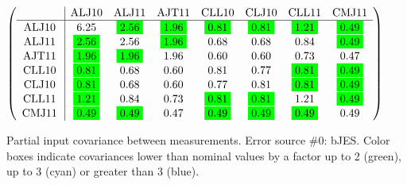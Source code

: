 \begin{table}[H]
\scriptsize
\begin{center}
\renewcommand{\arraystretch}{1.1}
\begin{math}\left(\begin{array}{c|ccccccc}
 & \mathrm{ALJ10} & 
\mathrm{ALJ11} & 
\mathrm{AJT11} & 
\mathrm{CLL10} & 
\mathrm{CLJ10} & 
\mathrm{CLL11} & 
\mathrm{CMJ11} \\
\hline
\mathrm{ALJ10} \hspace*{2pt} &       6.25 &  \colorbox{Green1}{$      2.56$} &  \colorbox{Green1}{$      1.96$} &  \colorbox{Green1}{$      0.81$} &  \colorbox{Green1}{$      0.81$} &  \colorbox{Green1}{$      1.21$} &  \colorbox{Green1}{$      0.49$} \\
\mathrm{ALJ11} \hspace*{2pt} &  \colorbox{Green1}{$      2.56$} &       2.56 &  \colorbox{Green1}{$      1.96$} &       0.68 &       0.68 &       0.84 &  \colorbox{Green1}{$      0.49$} \\
\mathrm{AJT11} \hspace*{2pt} &  \colorbox{Green1}{$      1.96$} &  \colorbox{Green1}{$      1.96$} &       1.96 &       0.60 &       0.60 &       0.73 &       0.47 \\
\mathrm{CLL10} \hspace*{2pt} &  \colorbox{Green1}{$      0.81$} &       0.68 &       0.60 &       0.81 &       0.77 &  \colorbox{Green1}{$      0.81$} &  \colorbox{Green1}{$      0.49$} \\
\mathrm{CLJ10} \hspace*{2pt} &  \colorbox{Green1}{$      0.81$} &       0.68 &       0.60 &       0.77 &       0.81 &  \colorbox{Green1}{$      0.81$} &  \colorbox{Green1}{$      0.49$} \\
\mathrm{CLL11} \hspace*{2pt} &  \colorbox{Green1}{$      1.21$} &       0.84 &       0.73 &  \colorbox{Green1}{$      0.81$} &  \colorbox{Green1}{$      0.81$} &       1.21 &  \colorbox{Green1}{$      0.49$} \\
\mathrm{CMJ11} \hspace*{2pt} &  \colorbox{Green1}{$      0.49$} &  \colorbox{Green1}{$      0.49$} &       0.47 &  \colorbox{Green1}{$      0.49$} &  \colorbox{Green1}{$      0.49$} &  \colorbox{Green1}{$      0.49$} &       0.49 \\
\end{array}\right)\end{math}
\caption{Partial input covariance between measurements. Error source \#0: bJES. Color boxes indicate covariances lower than nominal values by a factor up to 2 (green), up to 3 (cyan) or greater than 3 (blue).}
\renewcommand{\arraystretch}{1}
\end{center}
\end{table}
\clearpage
